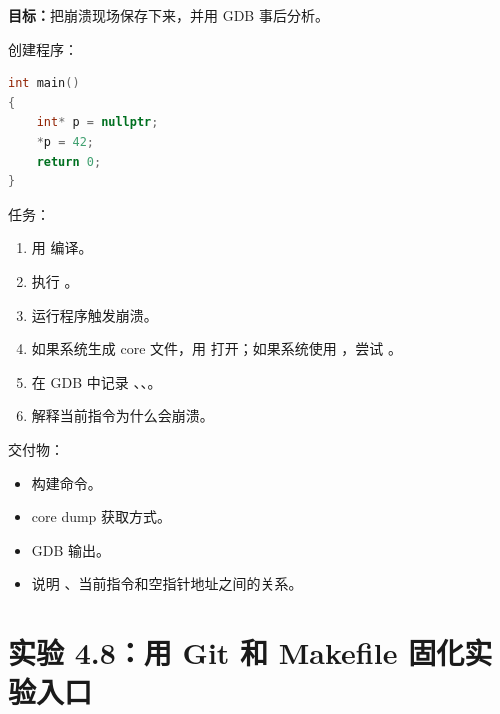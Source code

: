 \begin{labbox}
\textbf{目标：}把崩溃现场保存下来，并用 GDB 事后分析。

创建程序：

\begin{lstlisting}[language=C++]
int main()
{
    int* p = nullptr;
    *p = 42;
    return 0;
}
\end{lstlisting}

任务：

\begin{enumerate}
  \item 用  编译。
  \item 执行 。
  \item 运行程序触发崩溃。
  \item 如果系统生成 core 文件，用  打开；如果系统使用 ，尝试 。
  \item 在 GDB 中记录 、、。
  \item 解释当前指令为什么会崩溃。
\end{enumerate}

交付物：

\begin{itemize}
  \item 构建命令。
  \item core dump 获取方式。
  \item GDB 输出。
  \item 说明 、当前指令和空指针地址之间的关系。
\end{itemize}
\end{labbox}

\section{实验 4.8：用 Git 和 Makefile 固化实验入口}

